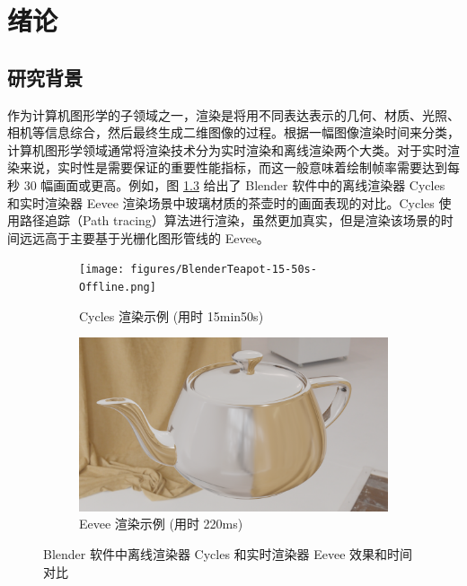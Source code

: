 
\chapter{绪论}

\section{研究背景}

作为计算机图形学的子领域之一，渲染是将用不同表达表示的几何、材质、光照、相机等信息综合，然后最终生成二维图像的过程。根据一幅图像渲染时间来分类，计算机图形学领域通常将渲染技术分为实时渲染和离线渲染两个大类。对于实时渲染来说，实时性是需要保证的重要性能指标，而这一般意味着绘制帧率需要达到每秒 30 幅画面或更高。例如，图 \ref{fig:blender_online_vs_offline} 给出了 Blender 软件中的离线渲染器 Cycles 和实时渲染器 Eevee 渲染场景中玻璃材质的茶壶时的画面表现的对比。Cycles 使用路径追踪（Path tracing）算法进行渲染，虽然更加真实，但是渲染该场景的时间远远高于主要基于光栅化图形管线的 Eevee。

\begin{figure}[htbp]
    \centering
    \begin{minipage}[b]{\textwidth}
        \begin{subfigure}[b]{0.48\textwidth}
            \texttt{[image: figures/BlenderTeapot-15-50s-Offline.png]}
            \caption{Cycles 渲染示例 (用时 15min50s)}
            \label{fig:sub_cycles}
        \end{subfigure}
        \hfill %
        \begin{subfigure}[b]{0.48\textwidth}
            \includegraphics[width=\textwidth]{figures/BlenderTeapot-220ms-Online.png}
            \caption{Eevee 渲染示例 (用时 220ms)}
            \label{fig:sub_eevee}
        \end{subfigure}
    \end{minipage}
    
    
    \caption{Blender 软件中离线渲染器 Cycles 和实时渲染器 Eevee 效果和时间对比}
    \label{fig:blender_online_vs_offline}
\end{figure}


